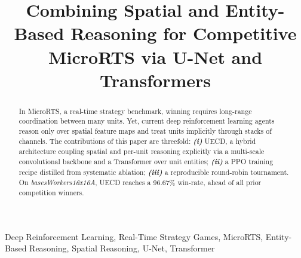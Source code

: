\documentclass[conference]{IEEEtran}
\newif\ifanonymous
\newcommand{\code}[1]{{\ttfamily\hyphenchar\font=45\relax #1}}
\begin{document}
\title{Combining Spatial and Entity-Based Reasoning for Competitive MicroRTS via U-Net and Transformers}

\ifanonymous
    \author{%
        \IEEEauthorblockN{Anonymous Author}
        \IEEEauthorblockA{
        Anonymous Institution\\
        Anonymous City, Country
        }
        \and
        \IEEEauthorblockN{Anonymous Author}
        \IEEEauthorblockA{
        Anonymous Institution\\
        Anonymous City, Country
        }
        \and
        \IEEEauthorblockN{Anonymous Author}
        \IEEEauthorblockA{
        Anonymous Institution\\
        Anonymous City, Country
        }
    }
\else
    \author{%
      \and
      \and
    }
\fi

\maketitle

\begin{abstract}
In MicroRTS, a real-time strategy benchmark, winning requires long-range coordination between many units. Yet, current deep reinforcement learning agents reason only over spatial feature maps and treat units implicitly through stacks of channels. The contributions of this paper are threefold: \textbf{\emph{(i)}} \code{UECD}, a hybrid architecture coupling spatial and per-unit reasoning explicitly via a multi-scale convolutional backbone and a Transformer over unit entities; \textbf{\emph{(ii)}} a PPO training recipe distilled from systematic ablation; \textbf{\emph{(iii)}} a reproducible round-robin tournament. On \emph{basesWorkers16x16A}, \code{UECD} reaches a $96.67$\% win-rate, ahead of all prior competition winners.
\end{abstract}

\begin{IEEEkeywords}
Deep Reinforcement Learning, Real-Time Strategy Games, MicroRTS, Entity-Based Reasoning, Spatial Reasoning, U-Net, Transformer
\end{IEEEkeywords}
\end{document}
